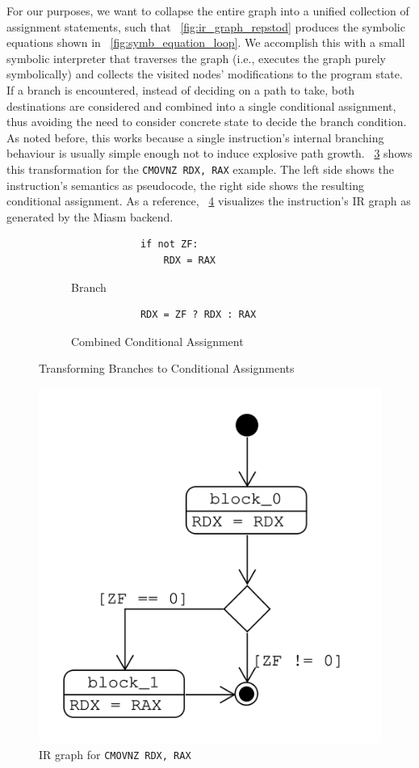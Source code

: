 For our purposes, we want to collapse the entire graph into a unified collection of assignment statements, such that
\figurename~\ref{fig:ir_graph_repstod} produces the symbolic equations shown in
\figurename~\ref{fig:symb_equation_loop}. We accomplish this with a small symbolic interpreter that traverses the graph
(i.e., executes the graph purely symbolically) and collects the visited nodes' modifications to the program state. If a
branch is encountered, instead of deciding on a path to take, both destinations are considered and combined into a
single conditional assignment, thus avoiding the need to consider concrete state to decide the branch condition. As
noted before, this works because a single instruction's internal branching behaviour is usually simple enough not to
induce explosive path growth. \figurename~\ref{fig:symb_branch_to_assign} shows this transformation for the
\texttt{CMOVNZ RDX, RAX} example. The left side shows the instruction's semantics as pseudocode, the right side shows
the resulting conditional assignment. As a reference, \figurename~\ref{fig:ir_graph_cmov} visualizes the instruction's
IR graph as generated by the Miasm backend.

\begin{figure}[htpb]
    \begin{subfigure}[b]{0.3\linewidth}
        \begin{lstlisting}
            if not ZF:
                RDX = RAX
        \end{lstlisting}
        \caption{Branch}\label{fig:symb_conditional_1}
    \end{subfigure}
    \hfill
    \begin{subfigure}[b]{0.5\linewidth}
        \begin{lstlisting}
            RDX = ZF ? RDX : RAX
        \end{lstlisting}
        \caption{Combined Conditional Assignment}\label{fig:symb_conditional_2}
    \end{subfigure}
    \caption{Transforming Branches to Conditional Assignments}\label{fig:symb_branch_to_assign}
\end{figure}

\begin{figure}[htpb]
    \centering
    \includegraphics[width=0.5\linewidth]{figures/ir_graph_cmov.png}
    \caption{IR graph for \texttt{CMOVNZ RDX, RAX}}\label{fig:ir_graph_cmov}
\end{figure}

